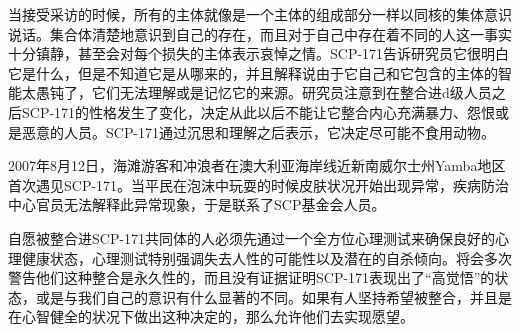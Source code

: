 当接受采访的时候，所有的主体就像是一个主体的组成部分一样以同核的集体意识说话。集合体清楚地意识到自己的存在，而且对于自己中存在着不同的人这一事实十分镇静，甚至会对每个损失的主体表示哀悼之情。SCP-171告诉研究员它很明白它是什么，但是不知道它是从哪来的，并且解释说由于它自己和它包含的主体的智能太愚钝了，它们无法理解或是记忆它的来源。研究员注意到在整合进d级人员之后SCP-171的性格发生了变化，决定从此以后不能让它整合内心充满暴力、怨恨或是恶意的人员。SCP-171通过沉思和理解之后表示，它决定尽可能不食用动物。

 2007年8月12日，海滩游客和冲浪者在澳大利亚海岸线近新南威尔士州Yamba地区首次遇见SCP-171。当平民在泡沫中玩耍的时候皮肤状况开始出现异常，疾病防治中心官员无法解释此异常现象，于是联系了SCP基金会人员。

 自愿被整合进SCP-171共同体的人必须先通过一个全方位心理测试来确保良好的心理健康状态，心理测试特别强调失去人性的可能性以及潜在的自杀倾向。将会多次警告他们这种整合是永久性的，而且没有证据证明SCP-171表现出了“高觉悟”的状态，或是与我们自己的意识有什么显著的不同。如果有人坚持希望被整合，并且是在心智健全的状况下做出这种决定的，那么允许他们去实现愿望。
